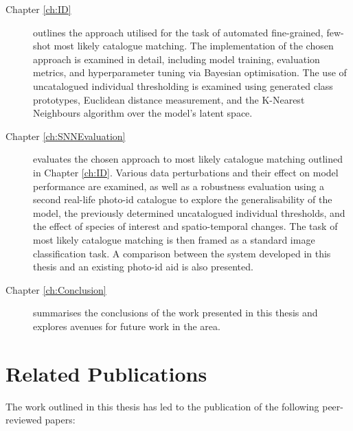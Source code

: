 \begin{description}
	\item[Chapter \ref{ch:ID}] outlines the approach utilised for the task of automated fine-grained, few-shot most likely catalogue matching. The implementation of the chosen approach is examined in detail, including model training, evaluation metrics, and hyperparameter tuning via Bayesian optimisation. The use of uncatalogued individual thresholding is examined using generated class prototypes, Euclidean distance measurement, and the K-Nearest Neighbours algorithm over the model's latent space. 
	
	\item[Chapter \ref{ch:SNNEvaluation}] evaluates the chosen approach to most likely catalogue matching outlined in Chapter \ref{ch:ID}. Various data perturbations and their effect on model performance are examined, as well as a robustness evaluation using a second real-life photo-id catalogue to explore the generalisability of the model, the previously determined uncatalogued individual thresholds, and the effect of species of interest and spatio-temporal changes. The task of most likely catalogue matching is then framed as a standard image classification task. A comparison between the system developed in this thesis and an existing photo-id aid is also presented.
	
	\item[Chapter \ref{ch:Conclusion}] summarises the conclusions of the work presented in this thesis and explores avenues for future work in the area.  
	 
\end{description}

\section{Related Publications}\label{ch:intro,relatedPublications}

The work outlined in this thesis has led to the publication of the following peer-reviewed papers:

